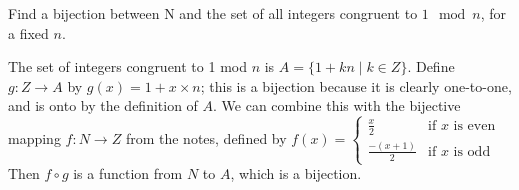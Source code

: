 \question Find a bijection between N and the set of all integers 
congruent to $1 \mod n$, for a fixed $n$.
\begin{solution}
The set of integers congruent to 1 mod $n$ is $A = \{1 + kn \mid k \in Z\}$. 
Define $g : Z \to A$ by $g(x) = 1 + x \times n$; this is a bijection 
because it is clearly one-to-one, and is onto by the definition of $A$. 
We can combine this with the bijective mapping $f : N \to Z$ from the 
notes, defined by
$f(x) = \begin{cases}
\frac{x}{2} & \text{if $x$ is even} \\ 
\frac{-(x + 1)}{2} & \text{if $x$ is odd}
\end{cases}$
Then $f \circ g$ is a function from $N$ to $A$, which is a bijection.
\end{solution}